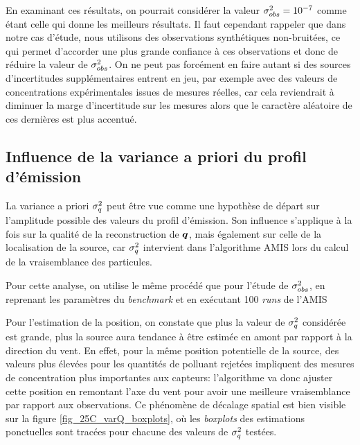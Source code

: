 En examinant ces résultats, on pourrait considérer la valeur ${\sigma_{obs}^2} = 10^{-7}$ comme étant celle qui donne les meilleurs résultats. Il faut cependant rappeler que dans notre cas d'étude, nous utilisons des observations synthétiques non-bruitées, ce qui permet d'accorder une plus grande confiance à ces observations et donc de réduire la valeur de ${\sigma_{obs}^2}$. On ne peut pas forcément en faire autant si des sources d'incertitudes supplémentaires entrent en jeu, par exemple avec des valeurs de concentrations expérimentales issues de mesures réelles, car cela reviendrait à diminuer la marge d'incertitude sur les mesures alors que le caractère aléatoire de ces dernières est plus accentué. 

  	


\subsection{Influence de la variance a priori du profil d'émission}

La variance a priori $\sigma_q^2$ peut être vue comme une hypothèse de départ sur l'amplitude possible des valeurs du profil d'émission. Son influence s'applique à la fois sur la qualité de la reconstruction de ${\bm{q}}$, mais également sur celle de la localisation de la source, car $\sigma_q^2$ intervient dans l'algorithme AMIS lors du calcul de la vraisemblance des particules. 

Pour cette analyse, on utilise le même procédé que pour l'étude de ${\sigma_{obs}^2}$, en reprenant les paramètres du \textit{benchmark} et en exécutant 100 \textit{runs} de l'AMIS 

Pour l'estimation de la position, on constate que plus la valeur de $\sigma_q^2$ considérée est grande, plus la source aura tendance à être estimée en amont  par rapport à la direction du vent. En effet, pour la même position potentielle de la source, des valeurs plus élevées pour les quantités de polluant rejetées impliquent des mesures de concentration plus importantes aux capteurs: l'algorithme va donc ajuster cette position en remontant l'axe du vent pour avoir une meilleure vraisemblance par rapport aux observations. Ce phénomène de décalage spatial est bien visible sur la figure \ref{fig_25C_varQ_boxplots}, où les \textit{boxplots} des estimations ponctuelles sont tracées pour chacune des valeurs de $\sigma_q^2$ testées.

